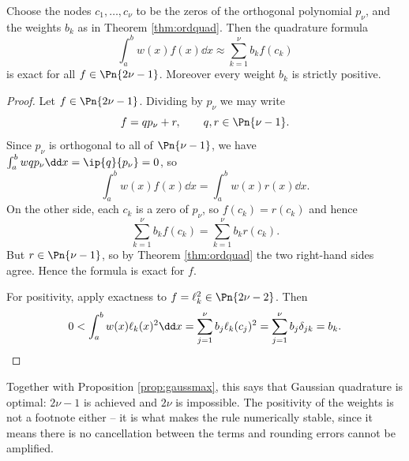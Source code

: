 \begin{theorem}\label{na-thm:gauss}
  Choose the nodes $c_1, \dots, c_\nu$ to be the zeros of the orthogonal polynomial $p_\nu$, and the weights $b_k$ as in Theorem \ref{thm:ordquad}. Then the quadrature formula
  $$
  \int_a^b w(x)f(x)\dd x \approx \sum_{k=1}^\nu b_k f(c_k)
  $$
  is exact for all $f \in \Pn{2\nu - 1}$. Moreover every weight $b_k$ is strictly positive.
\end{theorem}
\begin{proof}
  Let $f \in \Pn{2\nu-1}$. Dividing by $p_\nu$ we may write
  $$
  f = qp_\nu + r, \qquad q, r \in \Pn{\nu-1}.
  $$
  Since $p_\nu$ is orthogonal to all of $\Pn{\nu-1}$, we have $\int_a^b w q p_\nu \dd x = \ip{q}{p_\nu} = 0$, so
  $$
  \int_a^b w(x)f(x)\dd x = \int_a^b w(x)r(x)\dd x .
  $$
  On the other side, each $c_k$ is a zero of $p_\nu$, so $f(c_k) = r(c_k)$ and hence
  $$
  \sum_{k=1}^\nu b_k f(c_k) = \sum_{k=1}^\nu b_k r(c_k).
  $$
  But $r \in \Pn{\nu - 1}$, so by Theorem \ref{thm:ordquad} the two right-hand sides agree. Hence the formula is exact for $f$.

  For positivity, apply exactness to $f = \ell_k^2 \in \Pn{2\nu-2}$. Then
  $$
  0 < \int_a^b w(x)\ell_k(x)^2 \dd x = \sum_{j=1}^\nu b_j \ell_k(c_j)^2 = \sum_{j=1}^\nu b_j \delta_{jk} = b_k. \qedhere
  $$
\end{proof}

Together with Proposition \ref{prop:gaussmax}, this says that Gaussian quadrature is optimal: $2\nu - 1$ is achieved and $2\nu$ is impossible. The positivity of the weights is not a footnote either -- it is what makes the rule numerically stable, since it means there is no cancellation between the terms and rounding errors cannot be amplified.

